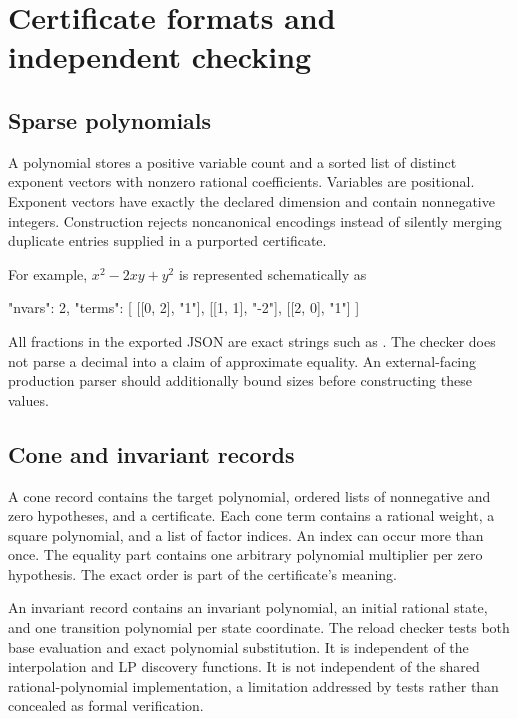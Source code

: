 \appendix
\section{Certificate formats and independent checking}

\subsection{Sparse polynomials}

A polynomial stores a positive variable count and a sorted list of distinct
exponent vectors with nonzero rational coefficients. Variables are positional.
Exponent vectors have exactly the declared dimension and contain nonnegative
integers. Construction rejects noncanonical encodings instead of silently
merging duplicate entries supplied in a purported certificate.

For example, $x^2-2xy+y^2$ is represented schematically as
\begin{Code}
{
  "nvars": 2,
  "terms": [
    [[0, 2], "1"],
    [[1, 1], "-2"],
    [[2, 0], "1"]
  ]
}
\end{Code}

All fractions in the exported JSON are exact strings such as .
The checker does not parse a decimal into a claim of approximate equality.
An external-facing production parser should additionally bound sizes before
constructing these values.

\subsection{Cone and invariant records}

A cone record contains the target polynomial, ordered lists of nonnegative
and zero hypotheses, and a certificate. Each cone term contains a rational
weight, a square polynomial, and a list of factor indices. An index can occur
more than once. The equality part contains one arbitrary polynomial multiplier
per zero hypothesis. The exact order is part of the certificate's meaning.

An invariant record contains an invariant polynomial, an initial rational state,
and one transition polynomial per state coordinate. The reload checker tests
both base evaluation and exact polynomial substitution. It is independent of
the interpolation and LP discovery functions. It is not independent of the
shared rational-polynomial implementation, a limitation addressed by tests
rather than concealed as formal verification.

